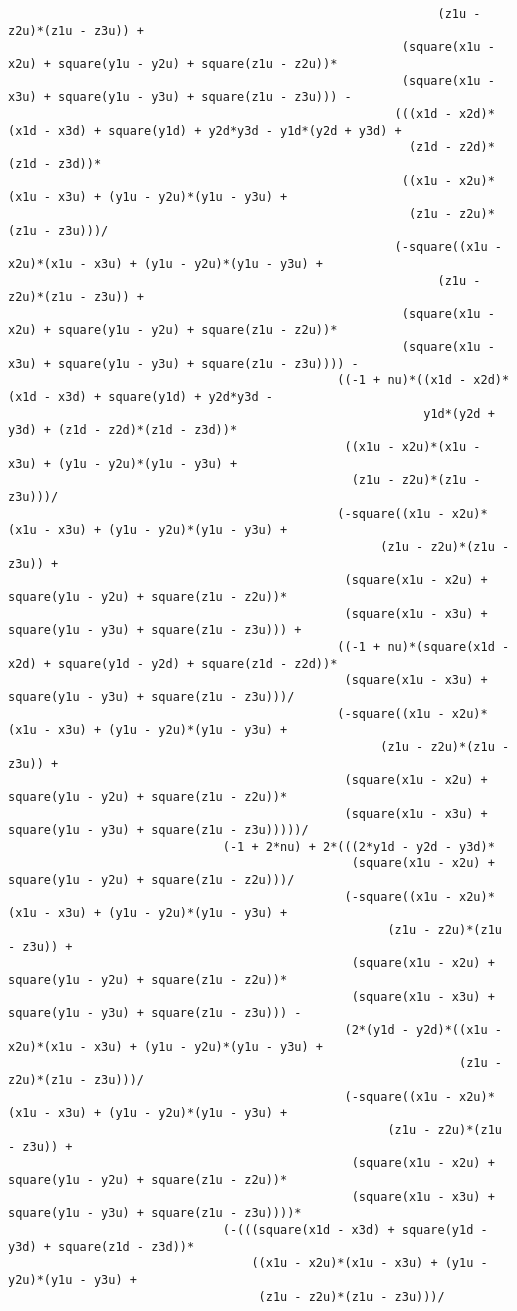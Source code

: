 \begin{lstlisting}
															(z1u - z2u)*(z1u - z3u)) + 
													   (square(x1u - x2u) + square(y1u - y2u) + square(z1u - z2u))*
													   (square(x1u - x3u) + square(y1u - y3u) + square(z1u - z3u))) - 
													  (((x1d - x2d)*(x1d - x3d) + square(y1d) + y2d*y3d - y1d*(y2d + y3d) + 
														(z1d - z2d)*(z1d - z3d))*
													   ((x1u - x2u)*(x1u - x3u) + (y1u - y2u)*(y1u - y3u) + 
														(z1u - z2u)*(z1u - z3u)))/
													  (-square((x1u - x2u)*(x1u - x3u) + (y1u - y2u)*(y1u - y3u) + 
															(z1u - z2u)*(z1u - z3u)) + 
													   (square(x1u - x2u) + square(y1u - y2u) + square(z1u - z2u))*
													   (square(x1u - x3u) + square(y1u - y3u) + square(z1u - z3u)))) - 
											  ((-1 + nu)*((x1d - x2d)*(x1d - x3d) + square(y1d) + y2d*y3d - 
														  y1d*(y2d + y3d) + (z1d - z2d)*(z1d - z3d))*
											   ((x1u - x2u)*(x1u - x3u) + (y1u - y2u)*(y1u - y3u) + 
												(z1u - z2u)*(z1u - z3u)))/
											  (-square((x1u - x2u)*(x1u - x3u) + (y1u - y2u)*(y1u - y3u) + 
													(z1u - z2u)*(z1u - z3u)) + 
											   (square(x1u - x2u) + square(y1u - y2u) + square(z1u - z2u))*
											   (square(x1u - x3u) + square(y1u - y3u) + square(z1u - z3u))) + 
											  ((-1 + nu)*(square(x1d - x2d) + square(y1d - y2d) + square(z1d - z2d))*
											   (square(x1u - x3u) + square(y1u - y3u) + square(z1u - z3u)))/
											  (-square((x1u - x2u)*(x1u - x3u) + (y1u - y2u)*(y1u - y3u) + 
													(z1u - z2u)*(z1u - z3u)) + 
											   (square(x1u - x2u) + square(y1u - y2u) + square(z1u - z2u))*
											   (square(x1u - x3u) + square(y1u - y3u) + square(z1u - z3u)))))/
							  (-1 + 2*nu) + 2*(((2*y1d - y2d - y3d)*
												(square(x1u - x2u) + square(y1u - y2u) + square(z1u - z2u)))/
											   (-square((x1u - x2u)*(x1u - x3u) + (y1u - y2u)*(y1u - y3u) + 
													 (z1u - z2u)*(z1u - z3u)) + 
												(square(x1u - x2u) + square(y1u - y2u) + square(z1u - z2u))*
												(square(x1u - x3u) + square(y1u - y3u) + square(z1u - z3u))) - 
											   (2*(y1d - y2d)*((x1u - x2u)*(x1u - x3u) + (y1u - y2u)*(y1u - y3u) + 
															   (z1u - z2u)*(z1u - z3u)))/
											   (-square((x1u - x2u)*(x1u - x3u) + (y1u - y2u)*(y1u - y3u) + 
													 (z1u - z2u)*(z1u - z3u)) + 
												(square(x1u - x2u) + square(y1u - y2u) + square(z1u - z2u))*
												(square(x1u - x3u) + square(y1u - y3u) + square(z1u - z3u))))*
							  (-(((square(x1d - x3d) + square(y1d - y3d) + square(z1d - z3d))*
								  ((x1u - x2u)*(x1u - x3u) + (y1u - y2u)*(y1u - y3u) + 
								   (z1u - z2u)*(z1u - z3u)))/

\end{lstlisting}
